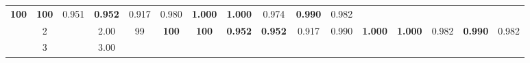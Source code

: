 \begin{table}[tph]
\begin{adjustbox}{angle=90}
{\begin{tabular}{c|c|cc|ccc|ccc|ccc|ccc}
                \textbf{100}
                                                                        &
                \textbf{100}
                                                                        & 0.951
                                                                        &
                \textbf{0.952}
                                                                        & 0.917
                                                                        & 0.980
                                                                        &
                \textbf{1.000}
                                                                        &
                \textbf{1.000}
                                                                        & 0.974
                                                                        &
                \textbf{0.990}
                                                                        & 0.982
                \\
                                                                        & 2
                                                                        &
                                                                        & 2.00                           &
                99
                                                                        &
                \textbf{100}
                                                                        &
                \textbf{100}
                                                                        &
                \textbf{0.952}
                                                                        &
                \textbf{0.952}
                                                                        & 0.917
                                                                        & 0.990                          &
                \textbf{1.000}
                                                                        &
                \textbf{1.000}
                                                                        & 0.982
                                                                        &
                \textbf{0.990}
                                                                        & 0.982
                \\
                                                                        & 3
                                                                        &
                                                                        & 3.00                           &

\end{tabular}}
\end{adjustbox}
\end{table}
